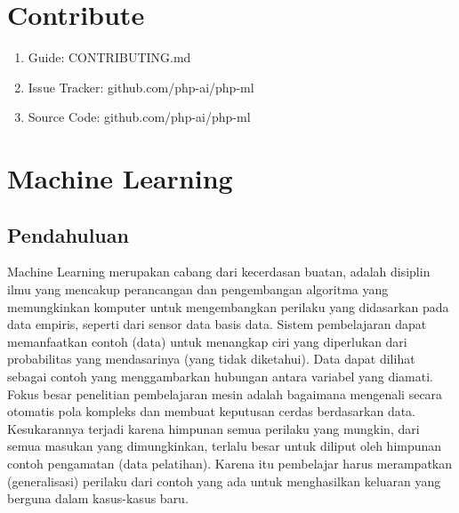 \section{Contribute}
\begin{enumerate}
\item Guide: CONTRIBUTING.md
\item Issue Tracker: github.com/php-ai/php-ml
\item Source Code: github.com/php-ai/php-ml
\end{enumerate}

\section{Machine Learning}
\subsection{Pendahuluan}
 Machine Learning merupakan cabang dari kecerdasan buatan, adalah disiplin ilmu yang mencakup perancangan dan pengembangan algoritma yang memungkinkan komputer untuk mengembangkan perilaku yang didasarkan pada data empiris, seperti dari sensor data basis data. Sistem pembelajaran dapat memanfaatkan contoh (data) untuk menangkap ciri yang diperlukan dari probabilitas yang mendasarinya (yang tidak diketahui). Data dapat dilihat sebagai contoh yang menggambarkan hubungan antara variabel yang diamati. Fokus besar penelitian pembelajaran mesin adalah bagaimana mengenali secara otomatis pola kompleks dan membuat keputusan cerdas berdasarkan data. Kesukarannya terjadi karena himpunan semua perilaku yang mungkin, dari semua masukan yang dimungkinkan, terlalu besar untuk diliput oleh himpunan contoh pengamatan (data pelatihan). Karena itu pembelajar harus merampatkan (generalisasi) perilaku dari contoh yang ada untuk menghasilkan keluaran yang berguna dalam kasus-kasus baru.

